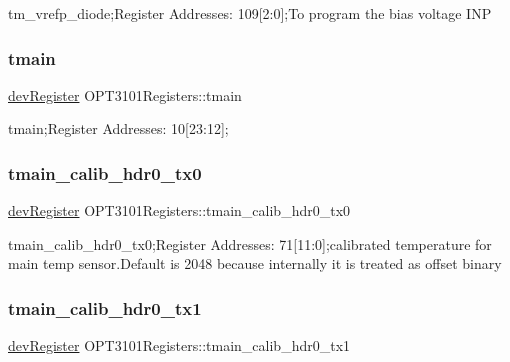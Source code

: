 tm\+\_\+vrefp\+\_\+diode;Register Addresses\+: 109\mbox{[}2\+:0\mbox{]};To program the bias voltage I\+NP 

\mbox{\label{class_o_p_t3101_registers_a864b8c40d5fa5d8dcf7e5fd49bfa889a}} 
\subsubsection{\texorpdfstring{tmain}{tmain}}
{\footnotesize\ttfamily \mbox{\hyperlink{classdev_register}{dev\+Register}} O\+P\+T3101\+Registers\+::tmain}



tmain;Register Addresses\+: 10\mbox{[}23\+:12\mbox{]}; 

\mbox{\label{class_o_p_t3101_registers_a399ffd68e53fd718d8c86cac5570b0f4}} 
\subsubsection{\texorpdfstring{tmain\+\_\+calib\+\_\+hdr0\+\_\+tx0}{tmain\_calib\_hdr0\_tx0}}
{\footnotesize\ttfamily \mbox{\hyperlink{classdev_register}{dev\+Register}} O\+P\+T3101\+Registers\+::tmain\+\_\+calib\+\_\+hdr0\+\_\+tx0}



tmain\+\_\+calib\+\_\+hdr0\+\_\+tx0;Register Addresses\+: 71\mbox{[}11\+:0\mbox{]};calibrated temperature for main temp sensor.\+Default is 2048 because internally it is treated as offset binary 

\mbox{\label{class_o_p_t3101_registers_ac520723279074397a7d777b16e6bcae7}} 
\subsubsection{\texorpdfstring{tmain\+\_\+calib\+\_\+hdr0\+\_\+tx1}{tmain\_calib\_hdr0\_tx1}}
{\footnotesize\ttfamily \mbox{\hyperlink{classdev_register}{dev\+Register}} O\+P\+T3101\+Registers\+::tmain\+\_\+calib\+\_\+hdr0\+\_\+tx1}



